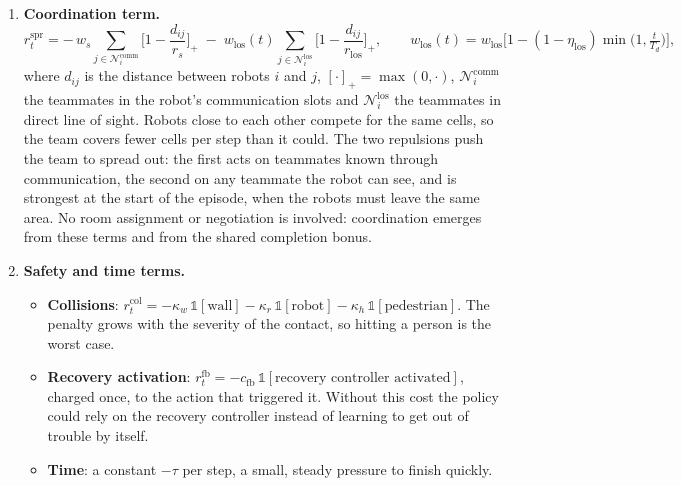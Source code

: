 \documentclass[11pt,a4paper]{article}
\begin{document}
\begin{enumerate}[label=\textbf{\arabic*.},resume]
\item \textbf{Coordination term.}
\[
  r^{\mathrm{spr}}_t =
  -\,w_s \!\!\sum_{j\in\mathcal{N}_i^{\mathrm{comm}}}\!\! \Big[1 - \frac{d_{ij}}{r_s}\Big]_+
  \;-\; w_{\mathrm{los}}(t) \!\!\sum_{j\in\mathcal{N}_i^{\mathrm{los}}}\!\! \Big[1 - \frac{d_{ij}}{r_{\mathrm{los}}}\Big]_+ ,
  \qquad
  w_{\mathrm{los}}(t) = w_{\mathrm{los}}\Big[1-(1-\eta_{\mathrm{los}})\min\!\big(1,\tfrac{t}{T_d}\big)\Big],
\]
where $d_{ij}$ is the distance between robots $i$ and $j$,
$[\cdot]_+=\max(0,\cdot)$, $\mathcal{N}_i^{\mathrm{comm}}$ the teammates in
the robot's communication slots and $\mathcal{N}_i^{\mathrm{los}}$ the
teammates in direct line of sight. Robots close to each other compete for
the same cells, so the team covers fewer cells per step than it could. The
two repulsions push the team to spread out: the first acts on teammates
known through communication, the second on any teammate the robot can see,
and is strongest at the start of the episode, when the robots must leave the
same area. No room assignment or negotiation is involved: coordination
emerges from these terms and from the shared completion bonus.

\item \textbf{Safety and time terms.}
\begin{itemize}
 \item \textbf{Collisions}:
 $r^{\mathrm{col}}_t = -\kappa_w\,\mathbb{1}[\text{wall}] - \kappa_r\,\mathbb{1}[\text{robot}]
 - \kappa_h\,\mathbb{1}[\text{pedestrian}]$. The penalty grows with the
 severity of the contact, so hitting a person is the worst case.
 \item \textbf{Recovery activation}:
 $r^{\mathrm{fb}}_t = -c_{\mathrm{fb}}\,\mathbb{1}[\text{recovery controller activated}]$,
 charged once, to the action that triggered it. Without this cost the
 policy could rely on the recovery controller instead of learning to get out
 of trouble by itself.
 \item \textbf{Time}: a constant $-\tau$ per step, a small, steady pressure to
 finish quickly.
\end{itemize}


\end{enumerate}
\end{document}
